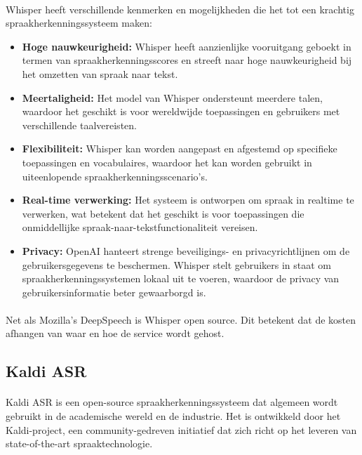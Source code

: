 \paragraph{}
Whisper heeft verschillende kenmerken en mogelijkheden die het tot een krachtig spraakherkenningssysteem maken:

\begin{itemize}
    \item \textbf{Hoge nauwkeurigheid:} Whisper heeft aanzienlijke vooruitgang geboekt in termen van spraakherkenningsscores en streeft naar hoge nauwkeurigheid bij het omzetten van spraak naar tekst.

    \item \textbf{Meertaligheid:} Het model van Whisper ondersteunt meerdere talen, waardoor het geschikt is voor wereldwijde toepassingen en gebruikers met verschillende taalvereisten.

    \item \textbf{Flexibiliteit:} Whisper kan worden aangepast en afgestemd op specifieke toepassingen en vocabulaires, waardoor het kan worden gebruikt in uiteenlopende spraakherkenningsscenario's.

    \item \textbf{Real-time verwerking:} Het systeem is ontworpen om spraak in realtime te verwerken, wat betekent dat het geschikt is voor toepassingen die onmiddellijke spraak-naar-tekstfunctionaliteit vereisen.

    \item \textbf{Privacy:} OpenAI hanteert strenge beveiligings- en privacyrichtlijnen om de gebruikersgegevens te beschermen. Whisper stelt gebruikers in staat om spraakherkenningssystemen lokaal uit te voeren, waardoor de privacy van gebruikersinformatie beter gewaarborgd is.
\end{itemize}

\paragraph{}
Net als Mozilla's DeepSpeech is Whisper open source. Dit betekent dat de kosten afhangen van waar en hoe de service wordt gehost.

\subsection{Kaldi ASR}

\paragraph{}
Kaldi ASR is een open-source spraakherkenningssysteem dat algemeen wordt gebruikt in de academische wereld en de industrie. Het is ontwikkeld door het Kaldi-project, een community-gedreven initiatief dat zich richt op het leveren van state-of-the-art spraaktechnologie.


